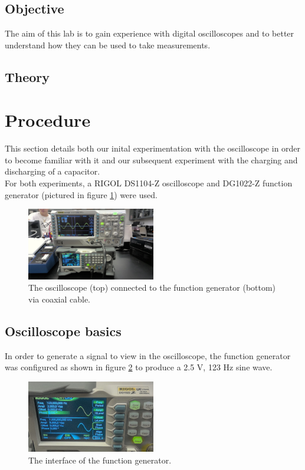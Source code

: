 \documentclass{article}
\begin{document}
    \subsection{Objective}
    The aim of this lab is to gain experience with digital oscilloscopes and to better understand how they can be used to take measurements.

    \subsection{Theory}\label{theory}
    

\section{Procedure}
    This section details both our inital experimentation with the oscilloscope in order to become familiar with it and our subsequent experiment with the charging and discharging of a capacitor.\\ %
    For both experiments, a RIGOL DS1104-Z oscilloscope and DG1022-Z function generator (pictured in figure \ref{oscnfunc1}) were used.

    \begin{figure}
        \centering
        \includegraphics[width=0.5\textwidth]{WIN_20240927_13_48_12_Pro.jpg} %
        \caption{The oscilloscope (top) connected to the function generator (bottom) via coaxial cable.}
        \label{oscnfunc1}
    \end{figure}

    \subsection{Oscilloscope basics}
        In order to generate a signal to view in the oscilloscope, the function generator was configured as shown in figure \ref{funcgen1} to produce a 2.5 V, 123 Hz sine wave.

        \begin{figure}
            \centering
            \includegraphics[width=0.5\textwidth]{WIN_20240927_13_51_59_Pro.jpg}
            \caption{The interface of the function generator.}
            \label{funcgen1}
        \end{figure}
\end{document}
